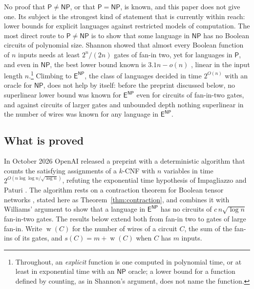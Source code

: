 \documentclass[11pt,reqno]{amsart}
\numberwithin{equation}{section}
\theoremstyle{plain}
\theoremstyle{definition}
\theoremstyle{remark}
\DeclareMathOperator{\wires}{w}
\newcommand{\Pc}{\mathsf{P}}
\newcommand{\NP}{\mathsf{NP}}
\newcommand{\ENP}{\mathsf{E}^{\mathsf{NP}}}
\newcommand{\oai}{OpenAI}
\begin{document}
No proof that $\Pc\ne\NP$, or that $\Pc=\NP$, is known, and this paper does not
give one. Its subject is the strongest kind of statement that is currently
within reach: lower bounds for explicit languages against restricted models of
computation. The most direct route to $\Pc\ne\NP$ is to show that some language
in $\NP$ has no Boolean circuits of polynomial size. Shannon \cite{Sha49}
showed that almost every Boolean function of $n$ inputs needs at least
$2^n/(2n)$ gates of fan-in two, yet for languages in $\Pc$, and even in $\NP$,
the best lower bound known is $3.1n-o(n)$ \cite{LY22}, linear in the input
length $n$.\footnote{Throughout, an \emph{explicit} function is one computed
in polynomial time, or at least in exponential time with an $\NP$ oracle; a
lower bound for a function defined by counting, as in Shannon's argument, does
not name the function.} Climbing to $\ENP$, the class of languages decided in
time $2^{O(n)}$ with an oracle for $\NP$, does not help by itself: before the
preprint \cite{OAI26} discussed below, no superlinear lower bound was known for
$\ENP$ even for circuits of fan-in-two gates, and against circuits of larger
gates and unbounded depth nothing superlinear in the number of wires was known
for any language in $\ENP$.

\subsection{What is proved}
In October 2026 \oai{} released a preprint \cite{OAI26} with a deterministic
algorithm that counts the satisfying assignments of a $k$-CNF with $n$ variables
in time $2^{O(n\log\log n/\sqrt{\log n})}$, refuting the exponential time
hypothesis of Impagliazzo and Paturi \cite{IP01}. The algorithm rests on a
contraction theorem for Boolean tensor networks \cite[Theorem D.1]{OAI26},
stated here as Theorem~\ref{thm:contraction}, and \cite[Corollary 1.4]{OAI26}
combines it with Williams' argument \cite{Wil13} to show that a language in
$\ENP$ has no circuits of $c\,n\sqrt{\log n}$ fan-in-two gates. The results
below extend both from fan-in two to gates of large fan-in. Write $\wires(C)$
for the number of wires of a circuit $C$, the sum of the fan-ins of its gates,
and $s(C)=m+\wires(C)$ when $C$ has $m$ inputs.
\end{document}
